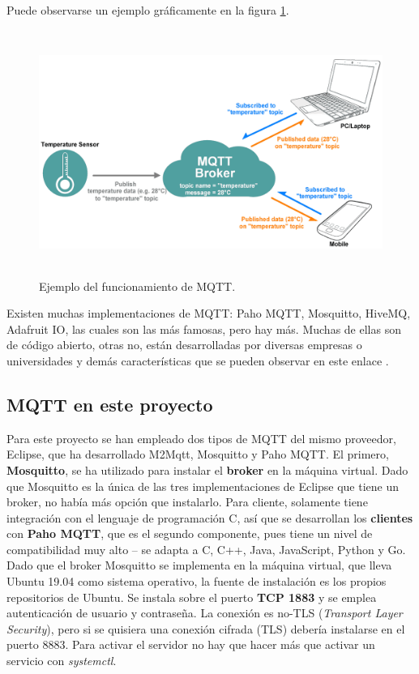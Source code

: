 \documentclass[12pt,spanish,listoffigures,listoftables]{tfgetsinf}
\begin{document}
Puede observarse un ejemplo gráficamente en la figura \ref{figura:mqttexplanation}.

\begin{figure}[!h]
	\centering
	\includegraphics[height=8cm]{img/mqttexplanation}
	\caption{Ejemplo del funcionamiento de MQTT.}
	\label{figura:mqttexplanation}
\end{figure}

Existen muchas implementaciones de MQTT: Paho MQTT, Mosquitto, HiveMQ, Adafruit IO, las cuales son las más famosas, pero hay más. Muchas de ellas son de código abierto, otras no, están desarrolladas por diversas empresas o universidades y demás características que se pueden observar en este enlace \cite{MQTTComparison}. \\

\subsection{MQTT en este proyecto}

Para este proyecto se han empleado dos tipos de MQTT del mismo proveedor, Eclipse, que ha desarrollado M2Mqtt, Mosquitto y Paho MQTT. El primero, \textbf{Mosquitto}, se ha utilizado para instalar el \textbf{broker} en la máquina virtual. Dado que Mosquitto es la única de las tres implementaciones de Eclipse que tiene un broker, no había más opción que instalarlo. Para cliente, solamente tiene integración con el lenguaje de programación C, así que se desarrollan los \textbf{clientes} con \textbf{Paho MQTT}, que es el segundo componente, pues tiene un nivel de compatibilidad muy alto -- se adapta a C, C++, Java, JavaScript, Python y Go. \\

Dado que el broker Mosquitto se implementa en la máquina virtual, que lleva Ubuntu 19.04 como sistema operativo, la fuente de instalación es los propios repositorios de Ubuntu. Se instala sobre el puerto \textbf{TCP 1883} y se emplea autenticación de usuario y contraseña. La conexión es no-TLS (\textit{Transport Layer Security}), pero si se quisiera una conexión cifrada (TLS) debería instalarse en el puerto 8883. Para activar el servidor no hay que hacer más que activar un servicio con \textit{systemctl}. \\
\end{document}
